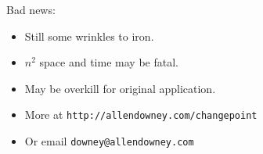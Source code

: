 \documentclass[pdf,allen]{prosper}
\begin{document}
\begin{slide}{}

Bad news:

\begin{itemize}

\item Still some wrinkles to iron.

\item $n^2$ space and time may be fatal.

\item May be overkill for original application.


\end{itemize}


\end{slide}


\begin{slide}{}

\begin{itemize}

\item More at {\tt http://allendowney.com/changepoint}

\item Or email {\tt downey@allendowney.com}


\end{itemize}


\end{slide}
\end{document}
